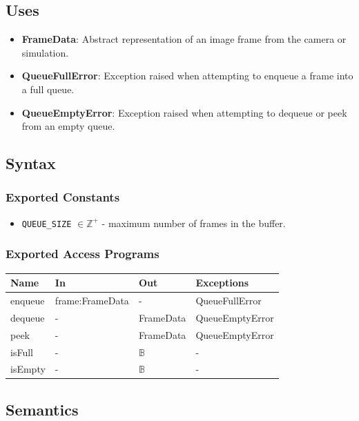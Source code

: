 \documentclass[12pt, titlepage]{article}
\begin{document}
\subsection{Uses}

\begin{itemize}
    \item \textbf{FrameData}: Abstract representation of an image frame from the camera or simulation.
    \item \textbf{QueueFullError}: Exception raised when attempting to enqueue a frame into a full queue.
    \item \textbf{QueueEmptyError}: Exception raised when attempting to dequeue or peek from an empty queue.
\end{itemize}

\subsection{Syntax}

\subsubsection{Exported Constants}
\begin{itemize}
\item \texttt{QUEUE\_SIZE} $\in \mathbb{Z}^{+}$ - maximum number of frames in the buffer.
\end{itemize}

\subsubsection{Exported Access Programs}
\begin{center}
\begin{tabular}{p{3cm} p{4cm} p{4cm} p{4cm}}
\hline
\textbf{Name} & \textbf{In} & \textbf{Out} & \textbf{Exceptions} \\
\hline
enqueue & frame:FrameData & - & QueueFullError \\
dequeue & - & FrameData & QueueEmptyError \\
peek & - & FrameData & QueueEmptyError \\
isFull & - & $\mathbb{B}$ & - \\
isEmpty & - & $\mathbb{B}$ & - \\
\hline
\end{tabular}
\end{center}

\subsection{Semantics}
\end{document}
